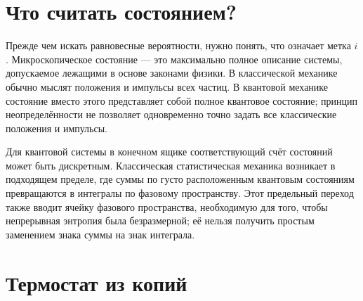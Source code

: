 \begin{classroomqa}
\end{classroomqa}

\section{Что считать состоянием?}

Прежде чем искать равновесные вероятности, нужно понять, что означает метка \(i\). Микроскопическое состояние — это максимально полное описание системы, допускаемое лежащими в основе законами физики. В классической механике обычно мыслят положения и импульсы всех частиц. В квантовой механике состояние вместо этого представляет собой полное квантовое состояние; принцип неопределённости не позволяет одновременно точно задать все классические положения и импульсы.

Для квантовой системы в конечном ящике соответствующий счёт состояний может быть дискретным. Классическая статистическая механика возникает в подходящем пределе, где суммы по густо расположенным квантовым состояниям превращаются в интегралы по фазовому пространству. Этот предельный переход также вводит ячейку фазового пространства, необходимую для того, чтобы непрерывная энтропия была безразмерной; её нельзя получить простым заменением знака суммы на знак интеграла.

\begin{classroomqa}
\end{classroomqa}

\section{Термостат из копий}

